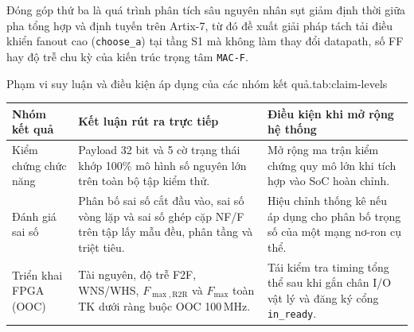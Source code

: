 Đóng góp thứ ba là quá trình phân tích sâu nguyên nhân sụt giảm định thời giữa pha
tổng hợp và định tuyến trên Artix-7, từ đó đề xuất giải pháp tách tải điều khiển
fanout cao (\texttt{choose\_a}) tại tầng S1 mà không làm thay đổi datapath, số FF
hay độ trễ chu kỳ của kiến trúc trọng tâm \texttt{MAC-F}.

\begin{engineeringtable}{Phạm vi suy luận và điều kiện áp dụng của các nhóm kết quả.}{tab:claim-levels}
\begin{tabularx}{\linewidth}{@{}>{\raggedright\arraybackslash}p{34mm}Y Y@{}}
\toprule
Nhóm kết quả & Kết luận rút ra trực tiếp & Điều kiện khi mở rộng hệ thống \\
\midrule
Kiểm chứng chức năng & Payload 32 bit và 5 cờ trạng thái khớp 100\% mô hình số nguyên lớn trên toàn bộ tập kiểm thử. & Mở rộng ma trận kiểm chứng quy mô lớn khi tích hợp vào SoC hoàn chỉnh. \\
Đánh giá sai số & Phân bố sai số cắt đầu vào, sai số vòng lặp và sai số ghép cặp NF/F trên tập lấy mẫu đều, phân tầng và triệt tiêu. & Hiệu chỉnh thống kê nếu áp dụng cho phân bố trọng số của một mạng nơ-ron cụ thể. \\
Triển khai FPGA (OOC) & Tài nguyên, độ trễ F2F, WNS/WHS, $F_{\max,\mathrm{R2R}}$ và $F_{\max}$ toàn TK dưới ràng buộc OOC 100\,MHz. & Tái kiểm tra timing tổng thể sau khi gắn chân I/O vật lý và đăng ký cổng \texttt{in\_ready}. \\
\bottomrule
\end{tabularx}
\end{engineeringtable}
